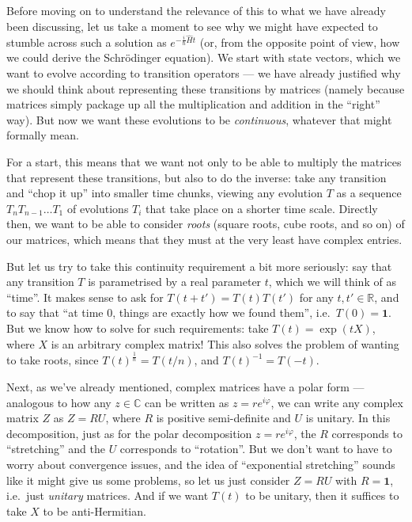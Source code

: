 \documentclass[fleqn]{article}
\begin{document}
Before moving on to understand the relevance of this to what we have already been discussing, let us take a moment to see why we might have expected to stumble across such a solution as \(e^{-\frac{i}{\hbar}\hat{H}t}\) (or, from the opposite point of view, how we could derive the Schrödinger equation).
We start with state vectors, which we want to evolve according to transition operators --- we have already justified why we should think about representing these transitions by matrices (namely because matrices simply package up all the multiplication and addition in the ``right'' way).
But now we want these evolutions to be \emph{continuous}, whatever that might formally mean.

For a start, this means that we want not only to be able to multiply the matrices that represent these transitions, but also to do the inverse: take any transition and ``chop it up'' into smaller time chunks, viewing any evolution \(T\) as a sequence \(T_nT_{n-1}\ldots T_1\) of evolutions \(T_i\) that take place on a shorter time scale.
Directly then, we want to be able to consider \emph{roots} (square roots, cube roots, and so on) of our matrices, which means that they must at the very least have complex entries.

But let us try to take this continuity requirement a bit more seriously: say that any transition \(T\) is parametrised by a real parameter \(t\), which we will think of as ``time''.
It makes sense to ask for \(T(t+t')=T(t)T(t')\) for any \(t,t'\in\mathbb{R}\), and to say that ``at time \(0\), things are exactly how we found them'', i.e.~\(T(0)=\mathbf{1}\).
But we know how to solve for such requirements: take \(T(t)=\exp(tX)\), where \(X\) is an arbitrary complex matrix!
This also solves the problem of wanting to take roots, since \(T(t)^{\frac{1}{n}}=T(t/n)\), and \(T(t)^{-1}=T(-t)\).

Next, as we've already mentioned, complex matrices have a polar form --- analogous to how any \(z\in\mathbb{C}\) can be written as \(z=re^{i\varphi}\), we can write any complex matrix \(Z\) as \(Z=RU\), where \(R\) is positive semi-definite and \(U\) is unitary.
In this decomposition, just as for the polar decomposition \(z=re^{i\varphi}\), the \(R\) corresponds to ``stretching'' and the \(U\) corresponds to ``rotation''.
But we don't want to have to worry about convergence issues, and the idea of ``exponential stretching'' sounds like it might give us some problems, so let us just consider \(Z=RU\) with \(R=\mathbf{1}\), i.e.~just \emph{unitary} matrices.
And if we want \(T(t)\) to be unitary, then it suffices to take \(X\) to be anti-Hermitian.
\end{document}

